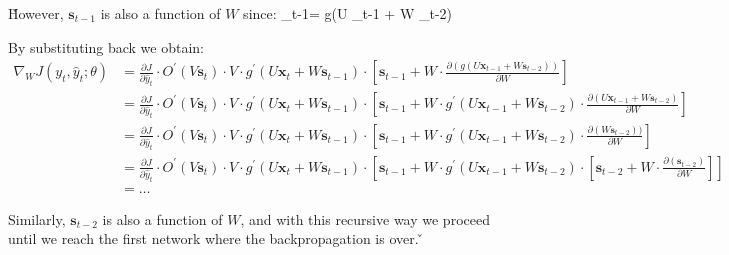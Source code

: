 \v

However, $\boldsymbol{s}_{t-1}$ is also a function of $W$ since:
\bse
{}_{t-1}= g(U _{t-1} + W _{t-2})
\ese

By substituting back we obtain:
{\setlength{\jot}{5pt}
\begin{align*}
\nabla_W J(y_t, \hat{y}_t ; \theta) & = \frac{\partial J}{\partial \hat{y}_t} \cdot O^\prime(V \boldsymbol{s}_{t})
\cdot V \cdot g^\prime(U \boldsymbol{x}_{t} + W \boldsymbol{s}_{t-1}) \cdot \left[ \boldsymbol{s}_{t-1} + W
\cdot \frac{\partial (g(U \boldsymbol{x}_{t-1} + W \boldsymbol{s}_{t-2}))} {\partial W} \right] \\
& = \frac{\partial J}{\partial \hat{y}_t} \cdot O^\prime(V\boldsymbol{s}_{t})
\cdot V \cdot g^\prime(U\boldsymbol{x}_{t} + W \boldsymbol{s}_{t-1})
\cdot \left[\boldsymbol{s}_{t-1} + W \cdot g^\prime (U\boldsymbol{x}_{t-1} + W \boldsymbol{s}_{t-2})
\cdot \frac{\partial (U\boldsymbol{x}_{t-1} + W \boldsymbol{s}_{t-2})} {\partial W} \right] \\
&= \frac{\partial J}{\partial \hat{y}_t} \cdot O^\prime(V\boldsymbol{s}_{t}) \cdot V
\cdot g^\prime(U\boldsymbol{x}_{t} + W \boldsymbol{s}_{t-1}) \cdot \left[\boldsymbol{s}_{t-1} + W \cdot g^\prime
(U \boldsymbol{x}_{t-1} + W \boldsymbol{s}_{t-2}) \cdot \frac{\partial (W \boldsymbol{s}_{t-2}))} {\partial W} \right] \\
&= \frac{\partial J}{\partial \hat{y}_t} \cdot O^\prime(V \boldsymbol{s}_{t}) \cdot V
\cdot g^\prime(U \boldsymbol{x}_{t} + W \boldsymbol{s}_{t-1}) \cdot \left[\boldsymbol{s}_{t-1} + W \cdot g^\prime
(U \boldsymbol{x}_{t-1} + W \boldsymbol{s}_{t-2}) \cdot \left[\boldsymbol{s}_{t-2} + W
\cdot \frac{\partial(\boldsymbol{s}_{t-2})} {\partial W} \right] \right] \\ &= \ldots
\end{align*}}

Similarly, $\boldsymbol{s}_{t-2}$ is also a function of $W$, and with this recursive way we proceed until we reach the
first network where the backpropagation is over. \v

